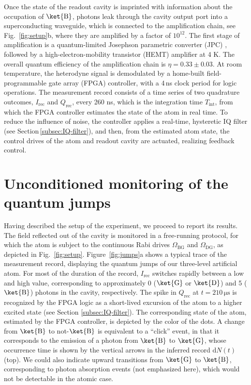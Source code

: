 Once the state of the readout cavity is imprinted with information
about the occupation of $\ket{\mathrm{B}}$, photons leak through
the cavity output port into a superconducting waveguide, which is
connected to the amplification chain, see Fig.~\ref{fig:setup}b,
where they are amplified by a factor of $10^{12}$. The first stage
of amplification is a quantum-limited Josephson parametric converter
(JPC) \citep{Bergeal2010}, followed by a high-electron-mobility transistor
(HEMT) amplifier at 4 K. The overall quantum efficiency of the amplification
chain is $\eta=0.33\pm0.03$. At room temperature, the heterodyne
signal is demodulated by a home-built field-programmable gate array
(FPGA) controller, with a 4\,ns clock period for logic operations.
The measurement record consists of a time series of two quadrature
outcomes, $I_{\mathrm{rec}}$ and $Q_{\mathrm{rec}}$, every 260 ns,
which is the integration time $T_{\mathrm{int}}$, from which the
FPGA controller estimates the state of the atom in real time. To reduce
the influence of noise, the controller applies a real-time, hysteretic
IQ filter (see Section\,\ref{subsec:IQ-filter}), and then, from
the estimated atom state, the control drives of the atom and readout
cavity are actuated, realizing feedback control. 

\section{Unconditioned monitoring of the quantum jumps\label{sec:Unconditioned-monitoring-of}}

Having described the setup of the experiment, we proceed to report
its results. The field reflected out of the cavity is monitored in
a free-running protocol, for which the atom is subject to the continuous
Rabi drives $\Omega_{\mathrm{BG}}$ and $\Omega_{\mathrm{DG}}$, as
depicted in Fig.~\ref{fig:setup}. Figure~\ref{fig:jumps}a shows
a typical trace of the measurement record, displaying the quantum
jumps of our three-level artificial atom. For most of the duration
of the record, $I_{\mathrm{rec}}$ switches rapidly between a low
and high value, corresponding to approximately 0 ($\ket{\mathrm{G}}$
or $\ket{\mathrm{D}}$) and 5 ($\ket{\mathrm{B}}$) photons in the
cavity, respectively. The spike in $Q_{\mathrm{rec}}$ at $t=210\,\mathrm{\mu s}$
is recognized by the FPGA logic as a short-lived excursion of the
atom to a higher excited state (see Section \ref{subsec:IQ-filter}).
The corresponding state of the atom, estimated by the FPGA controller,
is depicted by the color of the dots. A change from $\ket{\mathrm{B}}$
to not-$\ket{\mathrm{B}}$ is equivalent to a ``click'' event, in
that it corresponds to the emission of a photon from $\ket{\mathrm{B}}$
to $\ket{\mathrm{G}}$, whose occurrence time is shown by the vertical
arrows in the inferred record $\mathrm{d}N\left(t\right)$ (top).
We could also indicate upward transitions from $\ket{\mathrm{G}}$
to $\ket{\mathrm{B}}$, corresponding to photon absorption events
(not emphasized here), which would not be detectable in the atomic
case. 

